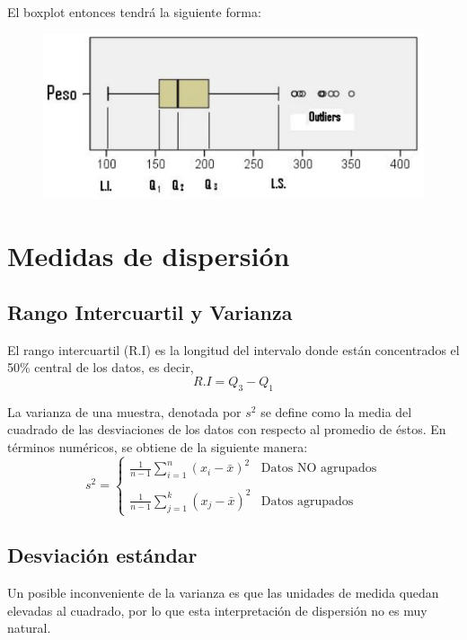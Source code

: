 \documentclass[12pt,twocolumn,a4paper]{report}
\begin{document}
El boxplot entonces tendrá la siguiente forma: 
\begin{figure}[H]
\centering
\includegraphics[scale=0.5]{graficos/7.png}
\end{figure}


\chapter*{Medidas de dispersión}

\section*{Rango Intercuartil y Varianza}
El rango intercuartil (R.I) es la longitud del intervalo donde están concentrados el 50\% central de los datos, es decir, $$R.I = Q_3 - Q_1$$

La varianza de una muestra, denotada por $s^2$ se define como la media del cuadrado de las desviaciones de los datos con respecto al promedio de éstos. En términos numéricos, se obtiene de la siguiente manera: 
\begin{equation*}
s^2= \left\{ \begin{array}{lc}
             \frac{1}{n-1}\sum_{i = 1}^{n} (x_i - \bar{x})^2 & \text{Datos NO agrupados} \\
             \\ \frac{1}{n-1}\sum_{j = 1}^{k} (x_j - \bar{x})^2  & \text{Datos agrupados}
             \end{array}
   \right.
\end{equation*}

\section*{Desviación estándar}
Un posible inconveniente de la varianza es que las unidades de medida quedan elevadas al cuadrado, por lo que esta interpretación de dispersión no es muy natural. 
\end{document}
